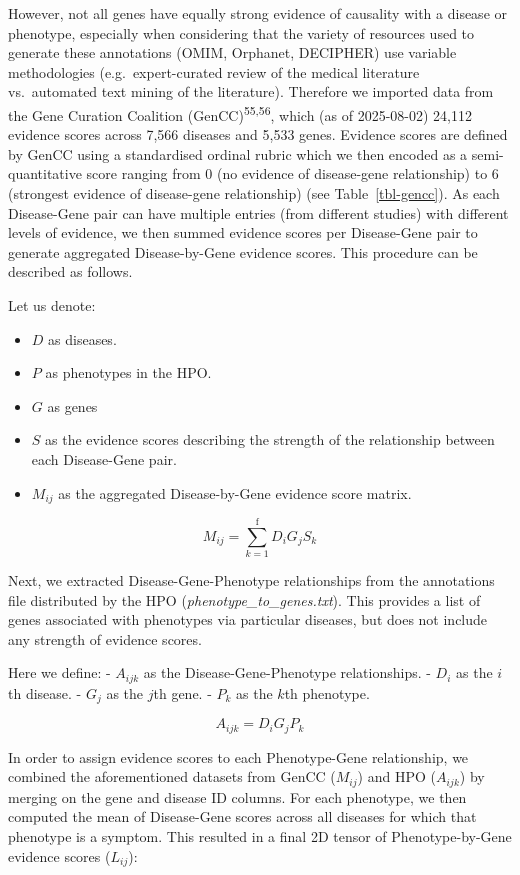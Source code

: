 \documentclass[
]{article}
\begin{document}
However, not all genes have equally strong evidence of causality with a
disease or phenotype, especially when considering that the variety of
resources used to generate these annotations (OMIM, Orphanet, DECIPHER)
use variable methodologies (e.g.~expert-curated review of the medical
literature vs.~automated text mining of the literature). Therefore we
imported data from the Gene Curation Coalition
(GenCC)\textsuperscript{55,56}, which (as of 2025-08-02) 24,112 evidence
scores across 7,566 diseases and 5,533 genes. Evidence scores are
defined by GenCC using a standardised ordinal rubric which we then
encoded as a semi-quantitative score ranging from 0 (no evidence of
disease-gene relationship) to 6 (strongest evidence of disease-gene
relationship) (see Table~\ref{tbl-gencc}). As each Disease-Gene pair can
have multiple entries (from different studies) with different levels of
evidence, we then summed evidence scores per Disease-Gene pair to
generate aggregated Disease-by-Gene evidence scores. This procedure can
be described as follows.

Let us denote:

\begin{itemize}
\item
  \(D\) as diseases.
\item
  \(P\) as phenotypes in the HPO.
\item
  \(G\) as genes
\item
  \(S\) as the evidence scores describing the strength of the
  relationship between each Disease-Gene pair.
\item
  \(M_{ij}\) as the aggregated Disease-by-Gene evidence score matrix.
\end{itemize}

\[
M_{ij} = \sum_{k=1}^{\text{f}} D_i G_j S_k
\]

Next, we extracted Disease-Gene-Phenotype relationships from the
annotations file distributed by the HPO
(\emph{phenotype\_to\_genes.txt}). This provides a list of genes
associated with phenotypes via particular diseases, but does not include
any strength of evidence scores.

Here we define: - \(A_{ijk}\) as the Disease-Gene-Phenotype
relationships. - \(D_i\) as the \(i\)th disease. - \(G_j\) as the
\(j\)th gene. - \(P_k\) as the \(k\)th phenotype.

\[
A_{ijk} = D_i G_j P_k
\]

In order to assign evidence scores to each Phenotype-Gene relationship,
we combined the aforementioned datasets from GenCC (\(M_{ij}\)) and HPO
(\(A_{ijk}\)) by merging on the gene and disease ID columns. For each
phenotype, we then computed the mean of Disease-Gene scores across all
diseases for which that phenotype is a symptom. This resulted in a final
2D tensor of Phenotype-by-Gene evidence scores (\(L_{ij}\)):
\end{document}
